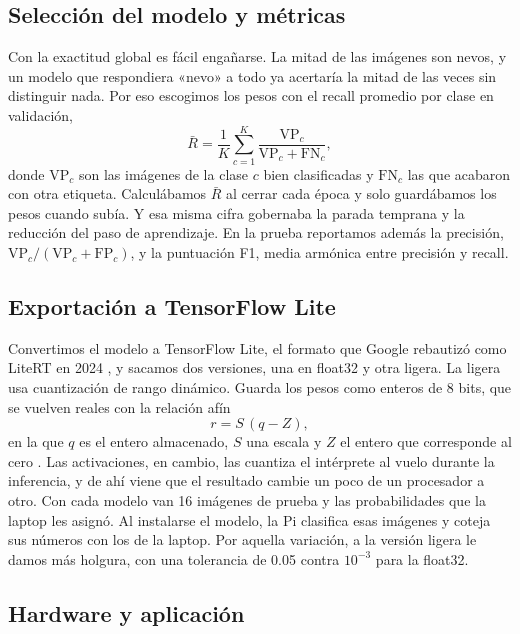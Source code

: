 \documentclass[pdflatex,sn-mathphys-num]{sn-jnl}%
\theoremstyle{thmstyleone}%
\theoremstyle{thmstyletwo}%
\theoremstyle{thmstylethree}%
\begin{document}
\subsection{Selección del modelo y métricas}\label{subsec10}

Con la exactitud global es fácil engañarse. La mitad de las imágenes son nevos, y un modelo que respondiera «nevo» a todo ya acertaría la mitad de las veces sin distinguir nada. Por eso escogimos los pesos con el recall promedio por clase en validación,
\begin{equation}
\bar{R} = \frac{1}{K}\sum_{c=1}^{K}\frac{\mathrm{VP}_c}{\mathrm{VP}_c+\mathrm{FN}_c},\label{eq4}
\end{equation}
donde $\mathrm{VP}_c$ son las imágenes de la clase $c$ bien clasificadas y $\mathrm{FN}_c$ las que acabaron con otra etiqueta. Calculábamos $\bar{R}$ al cerrar cada época y solo guardábamos los pesos cuando subía. Y esa misma cifra gobernaba la parada temprana y la reducción del paso de aprendizaje. En la prueba reportamos además la precisión, $\mathrm{VP}_c/(\mathrm{VP}_c+\mathrm{FP}_c)$, y la puntuación F1, media armónica entre precisión y recall.

\subsection{Exportación a TensorFlow Lite}\label{subsec11}

Convertimos el modelo a TensorFlow Lite, el formato que Google rebautizó como LiteRT en 2024 \cite{litert,litert_rename}, y sacamos dos versiones, una en float32 y otra ligera. La ligera usa cuantización de rango dinámico. Guarda los pesos como enteros de 8 bits, que se vuelven reales con la relación afín
\begin{equation}
r = S\,(q - Z),\label{eq5}
\end{equation}
en la que $q$ es el entero almacenado, $S$ una escala y $Z$ el entero que corresponde al cero \cite{jacob2018}. Las activaciones, en cambio, las cuantiza el intérprete al vuelo durante la inferencia, y de ahí viene que el resultado cambie un poco de un procesador a otro. Con cada modelo van 16 imágenes de prueba y las probabilidades que la laptop les asignó. Al instalarse el modelo, la Pi clasifica esas imágenes y coteja sus números con los de la laptop. Por aquella variación, a la versión ligera le damos más holgura, con una tolerancia de 0.05 contra $10^{-3}$ para la float32.

\subsection{Hardware y aplicación}\label{subsec12}
\end{document}
